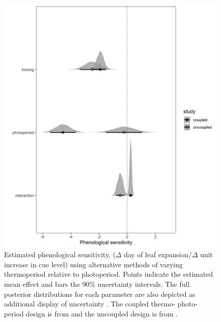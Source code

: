 \documentclass[11pt]{article}
\begin{document}
\begin{figure}[h!]
    \centering
 \includegraphics[width=.8\textwidth]{..//Plots/periodicity_figures/modelcomps_winter.jpeg}
    \caption{Estimated phenological sensitivity, ($\Delta$ day of leaf expansion/$\Delta$ unit increase in cue level) using alternative methods of varying thermoperiod relative to photoperiod. Points indicate the estimated mean effect and bars the 90\% uncertainty intervals. The full posterior distributions for each parameter are also depicted as additional display of uncertainty . The coupled thermo- photo- period design is from \citet{Flynn2018} and the uncoupled design is from \cite{Buonaiuto:2021ug}.}
    \label{fig:compy}
\end{figure}
\end{document}
